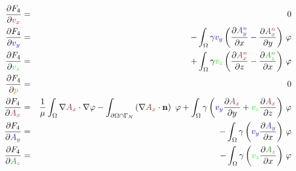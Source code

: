 \documentclass[smallextended]{svjour3}       %
\begin{document}
		\begin{eqnarray}
		\frac{\partial F_4}{\partial \textcolor{red}{v_x}} & = & 0 \\
		\frac{\partial F_4}{\partial \textcolor{blu}{v_y}} & = &
		-\int_{\Omega} \gamma \textcolor{blu}{v_y} \left(\frac{\partial \textcolor{darkblu}{A_y^n}}{\partial x} - \frac{\partial \textcolor{darkred}{A_x^n}}{\partial y}\right)\,\varphi  \\
		\frac{\partial F_4}{\partial \textcolor{gre}{v_z}} & = &
		+\int_{\Omega} \gamma \textcolor{gre}{v_z} \left(\frac{\partial \textcolor{darkred}{A_x^n}}{\partial z} - \frac{\partial \textcolor{darkgre}{A_z^n}}{\partial x}\right)\,\varphi\\
		\frac{\partial F_4}{\partial \textcolor{orange}{p}} & = & 0 \\
		\frac{\partial F_4}{\partial \textcolor{darkred}{A_x}} & = & 
		\frac{1}{\mu}\int_{\Omega}\nabla \textcolor{darkred}{A_x} \cdot \nabla \varphi - \int_{\partial \Omega \cap \Gamma_{N}} \left(\nabla \textcolor{darkred}{A_x}\cdot \mathbf{n}\right)\ \varphi 
			 + \int_{\Omega} \gamma \left(\textcolor{blu}{v_y} \frac{\partial \textcolor{darkred}{A_x}}{\partial y} + \textcolor{gre}{v_z} \frac{\partial \textcolor{darkred}{A_x}}{\partial z}\right)\,\varphi\\
		\frac{\partial F_4}{\partial \textcolor{darkblu}{A_y}} & = & 
		-  \int_{\Omega} \gamma \left(\textcolor{blu}{v_y} \frac{\partial \textcolor{darkblu}{A_y}}{\partial x}\right)\,\varphi\\
		\frac{\partial F_4}{\partial \textcolor{darkgre}{A_z}} & = & 
		-  \int_{\Omega} \gamma \left(\textcolor{gre}{v_z} \frac{\partial \textcolor{darkgre}{A_z}}{\partial x}\right)\,\varphi
		\end{eqnarray}
		
\end{document}
